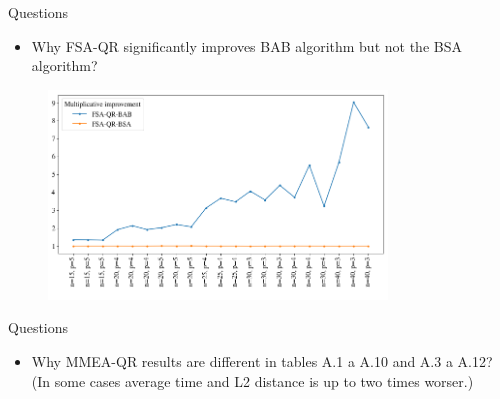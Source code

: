 \documentclass{beamer}
\begin{document}
\begin{frame}{Questions}
  \begin{itemize}
    \item Why FSA-QR significantly improves BAB algorithm but not the BSA algorithm?
  \end{itemize}      

  \begin{figure}[h]
    \centering
    \includegraphics[width=9cm]{exact_improvement}
  \end{figure}
\end{frame}

\begin{frame}{Questions}
  \begin{itemize}
    \item Why MMEA-QR results are different in tables A.1 a A.10 and  A.3 a A.12?
     (In some cases average time and L2 distance is up to two times worser.)
  \end{itemize}      
\end{frame}



\end{document}

